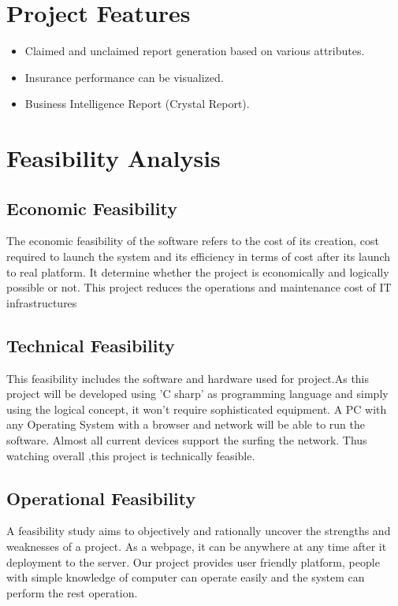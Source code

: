 \section{Project Features} \label{sec:feat}
\begin{itemize}
\item Claimed and unclaimed report generation based on various attributes.
\item Insurance performance can be visualized. 
\item Business Intelligence Report (Crystal Report). 
\end{itemize}






\section{Feasibility Analysis}

\subsection{Economic Feasibility}

The economic feasibility of the software refers to the cost of its creation, cost required
to launch the system and its efficiency in terms of cost after its launch to real platform.
It determine whether the project is economically and logically possible or not.  This
project reduces the operations and maintenance cost of IT infrastructures

\subsection{Technical Feasibility}
This feasibility includes the software and hardware used for project.As this project will be developed using 'C sharp' as programming language and simply using the logical concept, it won't require sophisticated equipment. A PC with any Operating System with a browser and network will be able to run the software. Almost all current devices support the surfing the network. Thus watching overall ,this project is technically feasible.

\subsection{Operational Feasibility}
A feasibility study aims to objectively and rationally uncover the strengths and weaknesses of a project. As a webpage, it can be anywhere at any time after it deployment to the server. Our project provides user friendly platform, people with simple knowledge of computer can operate easily and the system can perform the rest operation.

